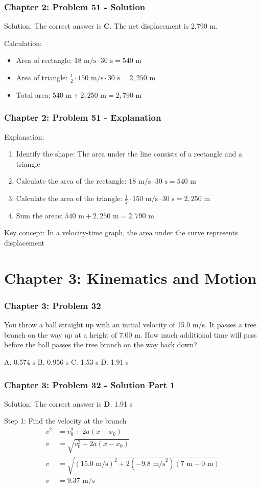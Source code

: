 \documentclass{beamer}
\begin{document}
\begin{frame}
\frametitle{Chapter 2: Problem 51 - Solution}
Solution: The correct answer is \textbf{C}. The net displacement is 2,790 m.

Calculation:
\begin{itemize}
    \item Area of rectangle: $18 \text{ m/s} \cdot 30 \text{ s} = 540 \text{ m}$
    \item Area of triangle: $\frac{1}{2} \cdot 150 \text{ m/s} \cdot 30 \text{ s} = 2,250 \text{ m}$
    \item Total area: $540 \text{ m} + 2,250 \text{ m} = 2,790 \text{ m}$
\end{itemize}
\end{frame}

\begin{frame}
\frametitle{Chapter 2: Problem 51 - Explanation}
Explanation:
\begin{enumerate}
    \item Identify the shape: The area under the line consists of a rectangle and a triangle
    \item Calculate the area of the rectangle: $18 \text{ m/s} \cdot 30 \text{ s} = 540 \text{ m}$
    \item Calculate the area of the triangle: $\frac{1}{2} \cdot 150 \text{ m/s} \cdot 30 \text{ s} = 2,250 \text{ m}$
    \item Sum the areas: $540 \text{ m} + 2,250 \text{ m} = 2,790 \text{ m}$
\end{enumerate}
Key concept: In a velocity-time graph, the area under the curve represents displacement
\end{frame}

\section{Chapter 3: Kinematics and Motion}

\begin{frame}
\frametitle{Chapter 3: Problem 32}
You throw a ball straight up with an initial velocity of 15.0 m/s. It passes a tree branch on the way up at a height of 7.00 m. How much additional time will pass before the ball passes the tree branch on the way back down?

A. 0.574 s
B. 0.956 s
C. 1.53 s
D. 1.91 s
\end{frame}

\begin{frame}
\frametitle{Chapter 3: Problem 32 - Solution Part 1}
Solution: The correct answer is \textbf{D}. 1.91 s

Step 1: Find the velocity at the branch
\begin{align*}
v^2 &= v_0^2 + 2a(x-x_0) \\
v &= \sqrt{v_0^2 + 2a(x-x_0)} \\
v &= \sqrt{(15.0 \text{ m/s})^2 + 2(-9.8 \text{ m/s}^2)(7 \text{ m} - 0 \text{ m})} \\
v &= 9.37 \text{ m/s}
\end{align*}
\end{frame}
\end{document}
